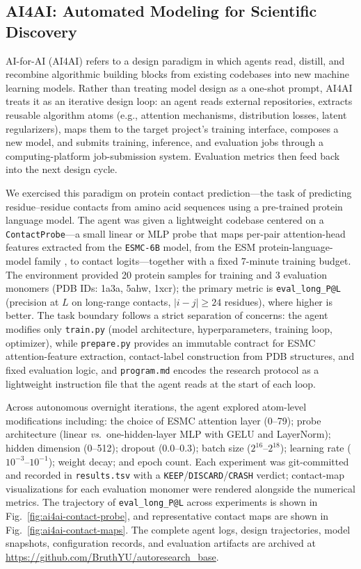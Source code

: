 \documentclass[sn-basic,Numbered,pdflatex]{sn-jnl}
\begin{document}
\FloatBarrier
\subsection{AI4AI: Automated Modeling for Scientific Discovery}

AI-for-AI (AI4AI) refers to a design paradigm in which agents read, distill, and recombine algorithmic building blocks from existing codebases into new machine learning models. Rather than treating model design as a one-shot prompt, AI4AI treats it as an iterative design loop: an agent reads external repositories, extracts reusable algorithm atoms (e.g., attention mechanisms, distribution losses, latent regularizers), maps them to the target project's training interface, composes a new model, and submits training, inference, and evaluation jobs through a computing-platform job-submission system. Evaluation metrics then feed back into the next design cycle.

We exercised this paradigm on protein contact prediction---the task of predicting residue--residue contacts from amino acid sequences using a pre-trained protein language model. The agent was given a lightweight codebase centered on a \texttt{ContactProbe}---a small linear or MLP probe that maps per-pair attention-head features extracted from the \texttt{ESMC-6B} model, from the ESM protein-language-model family \cite{lin2023esm2,hayes2025esm3}, to contact logits---together with a fixed 7-minute training budget. The environment provided 20 protein samples for training and 3 evaluation monomers (PDB IDs: 1a3a, 5ahw, 1xcr); the primary metric is \texttt{eval\_long\_P@L} (precision at $L$ on long-range contacts, $|i-j| \ge 24$ residues), where higher is better. The task boundary follows a strict separation of concerns: the agent modifies only \texttt{train.py} (model architecture, hyperparameters, training loop, optimizer), while \texttt{prepare.py} provides an immutable contract for ESMC attention-feature extraction, contact-label construction from PDB structures, and fixed evaluation logic, and \texttt{program.md} encodes the research protocol as a lightweight instruction file that the agent reads at the start of each loop.

Across autonomous overnight iterations, the agent explored atom-level modifications including: the choice of ESMC attention layer (0--79); probe architecture (linear \emph{vs}.~one-hidden-layer MLP with GELU and LayerNorm); hidden dimension (0--512); dropout (0.0--0.3); batch size ($2^{16}$--$2^{18}$); learning rate ($10^{-3}$--$10^{-1}$); weight decay; and epoch count. Each experiment was git-committed and recorded in \texttt{results.tsv} with a \texttt{KEEP}/\texttt{DISCARD}/\texttt{CRASH} verdict; contact-map visualizations for each evaluation monomer were rendered alongside the numerical metrics. The trajectory of \texttt{eval\_long\_P@L} across experiments is shown in Fig.~\ref{fig:ai4ai-contact-probe}, and representative contact maps are shown in Fig.~\ref{fig:ai4ai-contact-maps}. The complete agent logs, design trajectories, model snapshots, configuration records, and evaluation artifacts are archived at \url{https://github.com/BruthYU/autoresearch_base}.
\end{document}
